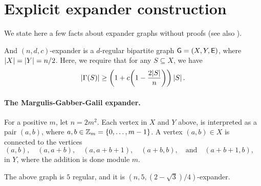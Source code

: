 
%





\ChapterPrefix{}
\ChapterGen{}


\providecommand{\altK}{\nu}


\section{Explicit expander construction}

We state here a few facts about expander graphs without proofs (see
also ).


\begin{defn}
    And $(n,d,c)$-expander is a $d$-regular bipartite graph
    $\mathsf{G}=(X,Y,\mathsf{E})$, where $\left| {X} \right| = \left| {Y} \right|=n/2$. Here,
    we require that for any $S \subseteq X$, we have
    \begin{equation*}
        \cardin{\Gamma(S)}\geq \pth{ 1 + c \pth{1- \frac{2|S|}{n}}} \cardin{S}.
    \end{equation*}
\end{defn}

\paragraph*{The Margulis-Gabber-Galil expander.}
For a positive $m$, let $n=2m^2$. Each vertex in $X$ and $Y$ above, is
interpreted as a pair $(a,b)$, where
$a, b \in \mathbb{Z}_m = \left\{ {0,\ldots, m-1} \right\}$. A vertex $(a,b) \in X$ is
connected to the vertices
\begin{equation*}
    (a,b), \quad%
    (a,a+b), \quad%
    (a,a+b+1), \quad%
    (a+b,b), \quad \text{and} \quad%
    (a+b+1,b), \quad%
\end{equation*}
in $Y$, where the addition is done module $m$. %

\begin{theorem}
    The above graph is $5$ regular, and it is
    $(n,5,(2-\sqrt{3})/4)$-expander.
\end{theorem}

